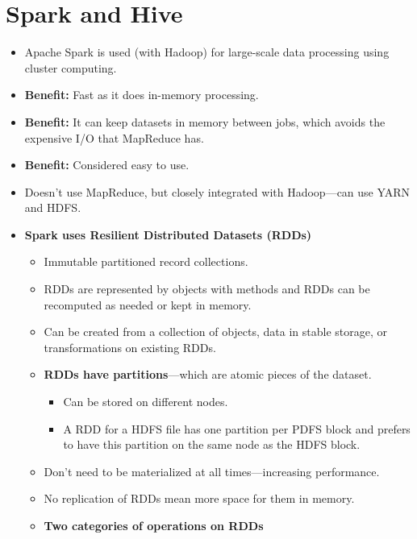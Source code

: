 
\section{Spark and Hive}
\begin{multicols}{2}
\begin{itemize}
\item
  Apache Spark is used (with Hadoop) for large-scale data processing
  using cluster computing.
\item
  \textbf{Benefit:} Fast as it does in-memory processing.
\item
  \textbf{Benefit:} It can keep datasets in memory between jobs, which
  avoids the expensive I/O that MapReduce has.
\item
  \textbf{Benefit:} Considered easy to use.
\item
  Doesn't use MapReduce, but closely integrated with Hadoop---can use
  YARN and HDFS.
\item
  \textbf{Spark uses Resilient Distributed Datasets (RDDs)}

  \begin{itemize}
    \item
    Immutable partitioned record collections.
  \item
    RDDs are represented by objects with methods and RDDs can be
    recomputed as needed or kept in memory.
  \item
    Can be created from a collection of objects, data in stable storage,
    or transformations on existing RDDs.
  \item
    \textbf{RDDs have partitions}---which are atomic pieces of the
    dataset.

    \begin{itemize}
        \item
      Can be stored on different nodes.
    \item
      A RDD for a HDFS file has one partition per PDFS block and prefers
      to have this partition on the same node as the HDFS block.
    \end{itemize}
  \item
    Don't need to be materialized at all times---increasing performance.
  \item
    No replication of RDDs mean more space for them in memory.
  \item
    \textbf{Two categories of operations on RDDs}


\end{itemize}
\end{itemize}
\end{multicols}

